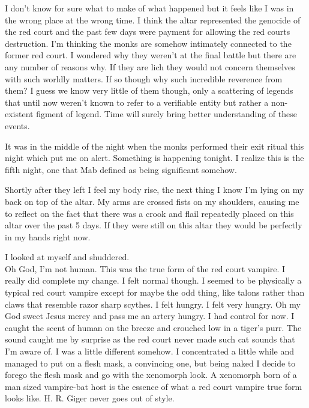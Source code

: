 I don't know for sure what to make of what happened but it feels like I was in the wrong place at the wrong time. I think the altar represented the genocide of the red court and the past few days were payment for allowing the red courts destruction. I'm thinking the monks are somehow intimately connected to the former red court. I wondered why they weren't at the final battle but there are any number of reasons why. If they are lich they would not concern themselves with such worldly matters. If so though why such incredible reverence from them? I guess we know very little of them though, only a scattering of legends that until now weren't known to refer to a verifiable entity but rather a non-existent figment of legend. Time will surely bring better understanding of these events.

It was in the middle of the night when the monks performed their exit ritual this night which put me on alert. Something is happening tonight. I realize this is the fifth night, one that Mab defined as being significant somehow.

Shortly after they left I feel my body rise, the next thing I know I'm lying on my back on top of the altar. My arms are crossed fists on my shoulders, causing me to reflect on the fact that there was a crook and flail repeatedly placed on this altar over the past 5 days. If they were still on this altar they would be perfectly in my hands right now.

\parasep

I looked at myself and shuddered.\\

Oh God, I'm not human. This was the true form of the red court vampire. I really did complete my change. I felt normal though. I seemed to be physically a typical red court vampire except for maybe the odd thing, like talons rather than claws that resemble razor sharp scythes. I felt hungry. I felt very hungry. Oh my God sweet Jesus mercy and pass me an artery hungry. I had control for now. I caught the scent of human on the breeze and crouched low in a tiger's purr. The sound caught me by surprise as the red court never made such cat sounds that I'm aware of. I was a little different somehow. I concentrated a little while and managed to put on a flesh mask, a convincing one, but being naked I decide to forego the flesh mask and go with the xenomorph look. A xenomorph born of a man sized vampire-bat host is the essence of what a red court vampire true form looks like. H. R. Giger never goes out of style. 


